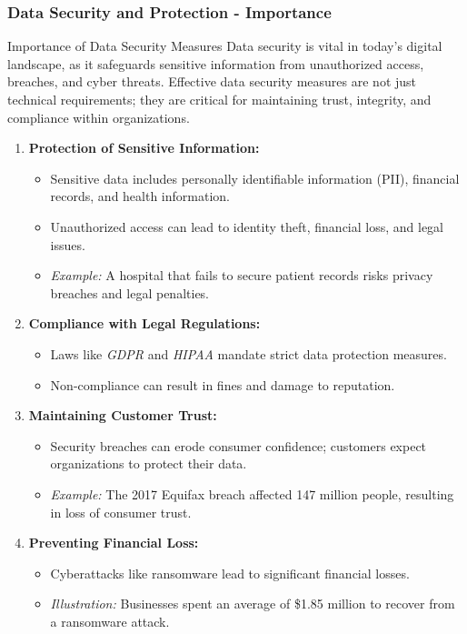 \documentclass{beamer}
\begin{document}
\begin{frame}[fragile]
    \frametitle{Data Security and Protection - Importance}

    \begin{block}{Importance of Data Security Measures}
        Data security is vital in today's digital landscape, as it safeguards sensitive information from unauthorized access, breaches, and cyber threats. Effective data security measures are not just technical requirements; they are critical for maintaining trust, integrity, and compliance within organizations.
    \end{block}

    \begin{enumerate}
        \item \textbf{Protection of Sensitive Information:}
            \begin{itemize}
                \item Sensitive data includes personally identifiable information (PII), financial records, and health information.
                \item Unauthorized access can lead to identity theft, financial loss, and legal issues.
                \item \textit{Example:} A hospital that fails to secure patient records risks privacy breaches and legal penalties.
            \end{itemize}
        
        \item \textbf{Compliance with Legal Regulations:}
            \begin{itemize}
                \item Laws like \textit{GDPR} and \textit{HIPAA} mandate strict data protection measures.
                \item Non-compliance can result in fines and damage to reputation.
            \end{itemize}
        
        \item \textbf{Maintaining Customer Trust:}
            \begin{itemize}
                \item Security breaches can erode consumer confidence; customers expect organizations to protect their data.
                \item \textit{Example:} The 2017 Equifax breach affected 147 million people, resulting in loss of consumer trust.
            \end{itemize}
        
        \item \textbf{Preventing Financial Loss:}
            \begin{itemize}
                \item Cyberattacks like ransomware lead to significant financial losses.
                \item \textit{Illustration:} Businesses spent an average of \$1.85 million to recover from a ransomware attack.
            \end{itemize}
    \end{enumerate}
\end{frame}
\end{document}

